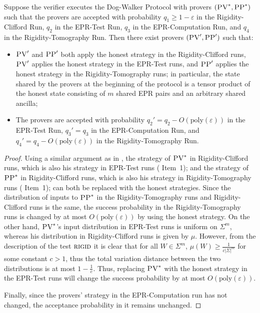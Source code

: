 \documentclass{toc}
\newcommand{\eps}{\varepsilon}
\newcommand{\rigid}{\textsc{rigid}}
\newcommand{\pv}{\textsc{PV}}
\newcommand{\pp}{\textsc{PP}}
\begin{document}
\begin{lemma}\label{lem:PV-2-PP-4}
Suppose the verifier executes the Dog-Walker Protocol 
with provers $(\pv^*,\pp^*)$ such that the provers are accepted with probability $q_1\geq 1-\eps$ in the Rigidity-Clifford Run, $q_2$ in the EPR-Test Run, $q_3$ in the EPR-Computation Run, and $q_4$ in the Rigidity-Tomography Run. Then there exist provers $(\pv',\pp')$ such that:
\begin{itemize}[nolistsep]
\item $\pv'$ and $\pp'$ both apply the honest strategy in the Rigidity-Clifford runs, $\pv'$ applies the honest strategy in the EPR-Test runs, and $\pp'$ applies the honest strategy in the Rigidity-Tomography runs; in particular, the state shared by the provers at the beginning of the protocol is a tensor product of the honest state consisting of $m$ shared EPR pairs and an arbitrary shared ancilla;
\item The provers are accepted with probability $q_2'=q_2-O(\mathrm{poly}(\eps))$ in the EPR-Test Run, $q_3'=q_3$ in the EPR-Computation Run, and $q_4'=q_4-O(\mathrm{poly}(\eps))$ in the Rigidity-Tomography Run. 
\end{itemize}
\end{lemma}

\begin{proof}
Using a similar argument as in , the strategy of $\pv^*$ in
Rigidity-Clifford runs, which is also his strategy in EPR-Test runs ( Item~1); and the strategy of $\pp^*$ in Rigidity-Clifford runs, which is also his strategy in Rigidity-Tomography runs ( Item~1);
 can both be replaced with the honest strategies. Since the distribution of inputs to $\pp^*$ in the Rigidity-Tomography runs and Rigidity-Clifford runs is the same, the success probability in the Rigidity-Tomography runs is changed by at most $O(\mathrm{poly}(\eps))$ by using the honest strategy. 
On the other hand, $\pv^*$'s input distribution in EPR-Test runs is uniform on $\Sigma^m$, whereas his distribution in Rigidity-Clifford runs is given by $\mu$. However, from the description of the test $\rigid$ it is clear that for all $W\in\Sigma^m$, $\mu(W)\geq \frac{1}{c|\Sigma|^m}$ for some constant $c>1$, thus the total variation distance between the two distributions is at most $1-\frac{1}{c}$. Thus, replacing $\pv^*$ with the honest strategy in the EPR-Test  runs will change the success probability by at most  $O(\mathrm{poly}(\eps))$. 

Finally, since the provers' strategy in the EPR-Computation run has not changed, the
  acceptance probability in it remains unchanged.
\end{proof}
\end{document}
